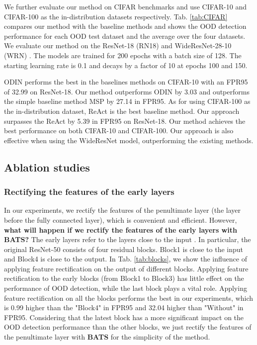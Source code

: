 \documentclass{article}
\begin{document}
We further evaluate our method on CIFAR benchmarks and use CIFAR-10 and CIFAR-100 \cite{krizhevsky2009learningCIFAR} as the in-distribution datasets respectively. Tab. \ref{tab:CIFAR} compares our method with the baseline methods and shows the OOD detection
performance for each OOD test dataset and the average over the four datasets. We evaluate our method on the ResNet-18 (RN18) \cite{he2016resnet} and WideResNet-28-10 (WRN) \cite{zagoruyko2017wideresnet}. The models are trained for 200 epochs with a batch size of 128. The {starting} learning rate is 0.1 and decays by a factor of 10 at epochs 100 and 150.

ODIN \cite{ODIN} performs the best in the baselines methods on CIFAR-10 with an FPR95 of 32.99 on ResNet-18. Our method outperforms ODIN by 3.03 and outperforms the simple baseline method MSP \cite{hendrycks17baseline} by 27.14 in FPR95. As for using CIFAR-100 as the in-distribution dataset, ReAct \cite{sun2021react} is the best baseline method. Our approach surpasses the ReAct by 5.39 in FPR95 on ResNet-18. Our method achieves the best performance on both CIFAR-10 and CIFAR-100. Our approach is also effective when using the WideResNet model, outperforming the existing methods.







\subsection{Ablation studies}
\subsubsection{Rectifying the features of the early layers} 
In our experiments, we rectify the features of the penultimate layer (the layer before the fully connected layer), which is convenient and efficient. However, \textbf{what will happen if we rectify the features of the early layers with BATS?} The early layers refer to the layers close to the input \cite{natureindividual}. In particular, the original ResNet-50 \cite{he2016resnet} consists of four residual blocks. Block1 is close to the input and Block4 is close to the output. In Tab. \ref{tab:blocks}, we show the influence of applying feature rectification on the output of different blocks. Applying feature rectification to the early blocks (from Block1 to Block3) has little effect on the performance of OOD detection, while the last block plays a vital role. Applying feature rectification on all the blocks performs the best in our experiments, which is 0.99 higher than the "Block4" in FPR95 and 32.04 higher than "Without" in FPR95. Considering that the latest block has a more significant impact on the OOD detection performance than the other blocks, we just rectify the features of the penultimate layer with \textbf{BATS} for the simplicity of the 
method. 
\end{document}
